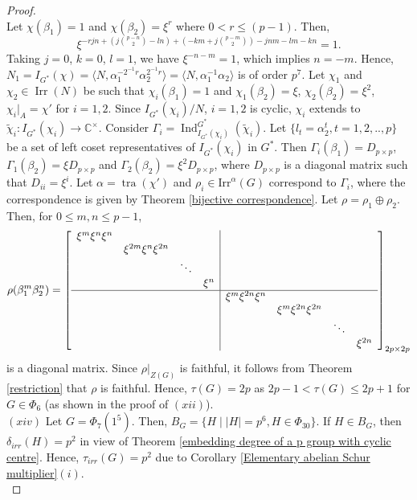\documentclass[a4paper,11pt]{amsart}
\numberwithin{equation}{section}
\numberwithin{equation}{subsection}
\newcommand{\C}{\mathbb{C}}
\begin{document}
\begin{proof}
\[\]
Let $\chi(\beta_1) = 1$ and $\chi(\beta_2) = \xi^r$ where $0 < r \le (p-1)$. Then,
\[\xi^{-rjn+(j\binom{p-n}{2}-ln)+(-km+j\binom{p-m}{2})-jnm-lm-kn} = 1.\] 
Taking $j=0$, $k=0$, $l=1$, we have $\xi^{-n-m} = 1$, which implies $n= -m$.
Hence, $N_1= I_{{G}^*}(\chi) = \langle N, \alpha_1^{-2^{-1}r}\alpha_2^{2^{-1}r} \rangle= \langle N, \alpha_1^{-1} \alpha_2 \rangle$ is of order $p^7$. Let $\chi_1$ and $\chi_2 \in \operatorname{Irr}(N)$ be such that $\chi_i(\beta_1)= 1$ and $\chi_1(\beta_2)= \xi$, $\chi_2(\beta_2)= \xi^2$, $\chi_i|_{A} = \chi'$ for $i=1,2$. 
Since $I_{G^*}(\chi_i)/N$, $i=1,2$ is cyclic, $\chi_i$ extends to $\tilde{\chi}_i: I_{G^*}(\chi_i)\to \C^\times$. Consider $\Gamma_i = \operatorname{Ind}^{G^*}_{I_{G^*}(\chi_i)}(\tilde{\chi}_i)$. Let $\{l_t= \alpha_2^t, t=1,2,..,p\}$ be a set of left coset representatives of $I_{G^*}(\chi_i)$ in $G^*$. Then $\Gamma_i(\beta_1)= D_{p \times p}$, $\Gamma_1(\beta_2)= \xi{D}_{p \times p}$ and $\Gamma_2(\beta_2)= \xi^2 D_{p \times p}$, where $D_{p \times p}$ is a diagonal matrix such that $D_{ii}= \xi^{i}$. Let $\alpha= \operatorname{tra}(\chi')$ and $\rho_i \in \mathrm{Irr}^\alpha(G)$ correspond to $\Gamma_i$, where the correspondence is given by Theorem \ref{bijective correspondence}. Let $\rho= \rho_1 \oplus \rho_2$. 
Then, for $0\leq m, n \leq p-1$,
$$\rho(\beta_1^m \beta_2^n)= \left[\begin{array}{cccc|cccc}
	\xi^{m}\xi^{n}\xi^{n} & & & & & & &\\
	& \xi^{2m}\xi^{n}\xi^{2n} & & & & & & \\
	& & \ddots & & & & & \\
	& & & \xi^{n} & & & & \\
	\hline
	& & & & \xi^{m}\xi^{2n}\xi^{n} & & & \\
	& & & & & \xi^{m}\xi^{2n}\xi^{2n} & &  \\
	& & & & & & \ddots & \\
	& & & & & & & \xi^{2n}  \\
\end{array}\right]_{2p \times 2p}$$
is a diagonal matrix.
Since $\rho|_{Z(G)}$ is faithful, it follows from Theorem \ref{restriction} that $\rho$ is faithful. Hence, $\tau(G) = 2p$ as $2p-1 < \tau(G) \leq 2p+1$ for $G\in \Phi_6$ (as shown in the proof of $(xii)$). \\

$(xiv)$ Let $G= \Phi_{7}(1^{5})$. Then, $B_{G}=\{H \mid |H|= p^6, H \in \Phi_{30}\}$. If $H \in B_{G}$, then $\delta_{irr}(H)= p^2$ in view of Theorem \ref{embedding degree of a p group with cyclic centre}. Hence, $\tau_{irr}(G)= p^2$ due to Corollary \ref{Elementary abelian Schur multiplier}$(i)$.  \\


\end{proof}
\end{document}
